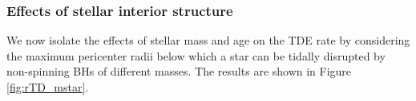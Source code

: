\documentclass[useAMS,usenatbib]{mn2e}
\def\msun{M_{\rm \odot}}
\def\mBH{M_{\rm BH}}
\def\Lcapt{L_{\rm capt}}
\def\LTD{L_{\rm TD}}
\def\Llc{L_{\rm lc}}
\def\Gammacapt{\Gamma_{\rm capt}}
\def\Gammalc{\Gamma_{\rm lc}}
\def\Gyr{{\rm Gyr}}
\begin{document}



\subsubsection{Effects of stellar interior structure}

We now isolate the effects of stellar mass and age on the TDE rate by considering the maximum pericenter radii below which a star can be tidally disrupted by non-spinning BHs of different masses. The results are shown in Figure \ref{fig:rTD_mstar}.
\end{document}
